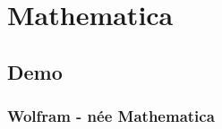 % 

\section{Mathematica}

\subsection{Demo}
\begin{frame}\frametitle{Wolfram - n\'{e}e Mathematica}
\center
\end{frame}
%

%

\endinput  %

